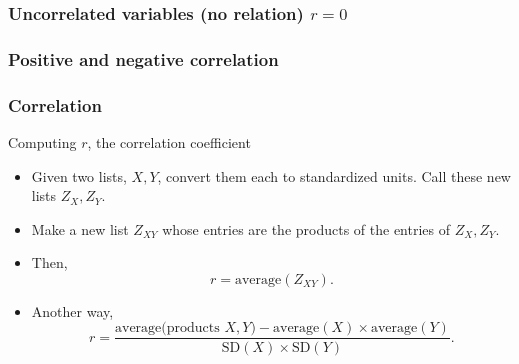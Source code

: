 \documentclass[handout]{beamer}
\begin{document}
   \begin{frame}
   \frametitle{Uncorrelated variables (no relation) $r=0$}
   \begin{center}
   \end{center}

   \end{frame}



   \begin{frame}
   \frametitle{Positive and negative correlation}
   \begin{center}
   \end{center}

   \end{frame}


   \begin{frame} \frametitle{Correlation}

   \begin{block}
   {Computing $r$, the correlation coefficient}

   \begin{itemize}
   \item Given two lists, $X, Y$, convert them
   each to standardized units. Call these new lists $Z_X, Z_Y$.

   \item Make a new list $Z_{XY}$ whose entries are the products
   of the entries of $Z_X, Z_Y$.
   \item Then,
   $$
   r = \text{average}(Z_{XY}).
   $$
   \item Another way,
   $$
   r = \frac{\text{average(products $X, Y$)} - \text{average}(X) \times \text{average}(Y)}{\text{SD}(X) \times \text{SD}(Y)}.
   $$
   \end{itemize}
   \end{block}
   \end{frame}
\end{document}
